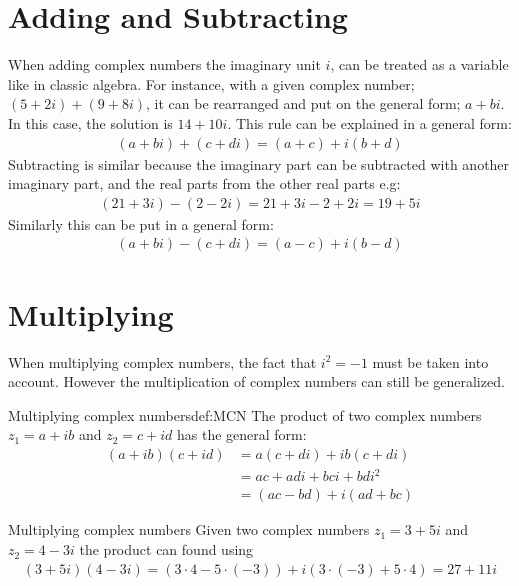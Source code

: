\section{Adding and Subtracting}
When adding complex numbers the imaginary unit $i$, can be treated as a variable like in classic algebra. For instance, with a given complex number; $(5+2i)+(9+8i)$, it can be rearranged and put on the general form; $a+bi$. In this case, the solution is $14+10i$. This rule can be explained in a general form: 
\begin{align*}
(a + bi) + (c + di) = (a + c) + i(b + d)
\end{align*}
Subtracting is similar because the imaginary part can be subtracted with another imaginary part, and the real parts from the other real parts e.g:
\begin{align*}
(21 + 3i) - (2 - 2i) = 21 + 3i - 2 + 2i = 19 + 5i
\end{align*}
Similarly this can be put in a general form:
\begin{align*}
(a + bi) - (c + di) = (a - c) + i(b - d)
\end{align*}

\section{Multiplying}
When multiplying complex numbers, the fact that $i^2 =-1$ must be taken into account. However the multiplication of complex numbers can still be generalized. 
\begin{definition}{Multiplying complex numbers}{def:MCN}
The product of two complex numbers $z_1=a+ib$ and $z_2=c+id$ has the general form:
\begin{align*}
(a+ib)(c+id)&=a(c+di)+ib(c+di)
\\
&=ac+adi+bci+bdi^2
\\
&=(ac-bd)+i(ad+bc)
\end{align*}
\end{definition}
\begin{example}{Multiplying complex numbers}{}
Given two complex numbers $z_1=3+5i$ and $z_2=4-3i$ the product can found using 
\begin{align*}
(3+5i)(4-3i) = (3\cdot4-5\cdot(-3))+i(3\cdot(-3)+5\cdot4)=27+11i
\end{align*}
\end{example}


